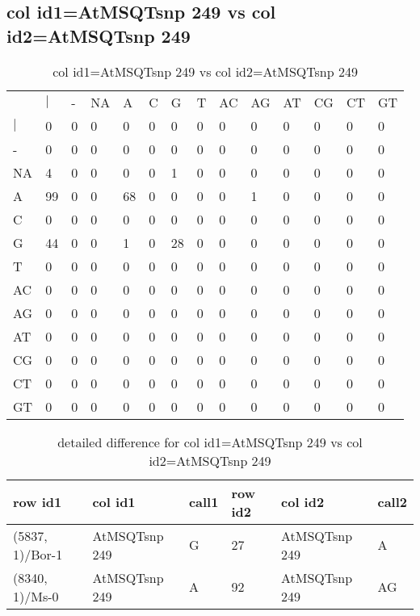 \subsection{col id1=AtMSQTsnp 249 vs col id2=AtMSQTsnp 249}
\begin{center}
\begin{longtable}{|l|l|l|l|l|l|l|l|l|l|l|l|l|l|}
\caption{col id1=AtMSQTsnp 249 vs col id2=AtMSQTsnp 249} \label{table_dm608}\\
\hline
\\
\hline
&$|$&-&NA&A&C&G&T&AC&AG&AT&CG&CT&GT\\
$|$&0&0&0&0&0&0&0&0&0&0&0&0&0\\
-&0&0&0&0&0&0&0&0&0&0&0&0&0\\
NA&4&0&0&0&0&1&0&0&0&0&0&0&0\\
A&99&0&0&68&0&0&0&0&1&0&0&0&0\\
C&0&0&0&0&0&0&0&0&0&0&0&0&0\\
G&44&0&0&1&0&28&0&0&0&0&0&0&0\\
T&0&0&0&0&0&0&0&0&0&0&0&0&0\\
AC&0&0&0&0&0&0&0&0&0&0&0&0&0\\
AG&0&0&0&0&0&0&0&0&0&0&0&0&0\\
AT&0&0&0&0&0&0&0&0&0&0&0&0&0\\
CG&0&0&0&0&0&0&0&0&0&0&0&0&0\\
CT&0&0&0&0&0&0&0&0&0&0&0&0&0\\
GT&0&0&0&0&0&0&0&0&0&0&0&0&0\\
\hline
\end{longtable}
\end{center}

\begin{center}
\begin{longtable}{|l|l|l|l|l|l|}
\caption{detailed difference for col id1=AtMSQTsnp 249 vs col id2=AtMSQTsnp 249} \label{table_dm609}\\
\hline
row id1&col id1&call1&row id2&col id2&call2\\
\hline
(5837, 1)/Bor-1&AtMSQTsnp 249&G&27&AtMSQTsnp 249&A\\
(8340, 1)/Ms-0&AtMSQTsnp 249&A&92&AtMSQTsnp 249&AG\\
\hline
\end{longtable}
\end{center}

